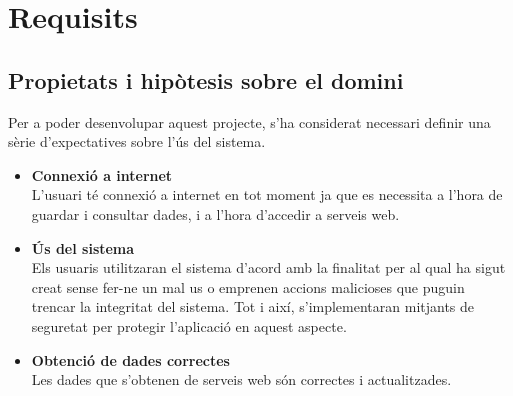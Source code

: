 
\chapter{Requisits} %

\label{Requisits} %

\section{Propietats i hipòtesis sobre el domini}

Per a poder desenvolupar aquest projecte, s’ha considerat necessari definir una sèrie d’expectatives sobre l’ús del sistema.
\begin{itemize}
\item{}\textbf{Connexió a internet}\\
L’usuari té connexió a internet en tot moment ja que es necessita a l’hora
de guardar i consultar dades, i a l’hora d’accedir a serveis web.
\item{}\textbf{Ús del sistema}\\
Els usuaris utilitzaran el sistema d’acord amb la finalitat per al qual ha
sigut creat sense fer-ne un mal us o emprenen accions malicioses que puguin trencar la integritat del sistema. Tot i així, s’implementaran mitjants de seguretat per protegir l’aplicació en aquest aspecte.
\item{}\textbf{Obtenció de dades correctes}\\
 Les dades que s’obtenen de serveis web són
correctes i actualitzades.

\end{itemize}

